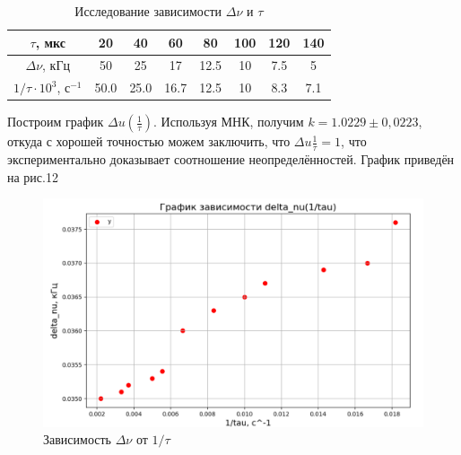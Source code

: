\documentclass[a4paper,12pt]{article}
\theoremstyle{definition}
\begin{document}
\begin{enumerate}
\begin{table}[h!]
\centering
\begin{tabular}{|c|c|c|c|c|c|c|c|}
\hline
$\tau$, мкс & 20 & 40 & 60 & 80 & 100 & 120 & 140 \\ \hline
$\Delta \nu$, кГц & 50 & 25 & 17 & 12.5 & 10 & 7.5 & 5 \\ \hline
$1/\tau \cdot 10^3$, с$^{-1}$ & 50.0 & 25.0 & 16.7 & 12.5 & 10 & 8.3 & 7.1 \\ \hline
\end{tabular}
\caption{Исследование зависимости $\Delta \nu$ и $\tau$}
\label{table2}
\end{table}
Построим график $\Delta
u\left(\frac{1}{\tau}\right)$. Используя МНК, получим $k=1.0229\pm0,0223$, откуда с хорошей точностью можем заключить, что $\Delta
u\frac{1}{\tau}=1$, что экспериментально доказывает соотношение неопределённостей. График приведён на рис.12
\begin{figure}[H] %
\centering
\includegraphics[width=0.7\linewidth]{Снимок экрана 2024-12-20 222205.png}
\caption{Зависимость $\Delta \nu$ от $1/\tau$}
\label{grafic1}
\end{figure}


\end{enumerate}
\end{document}
